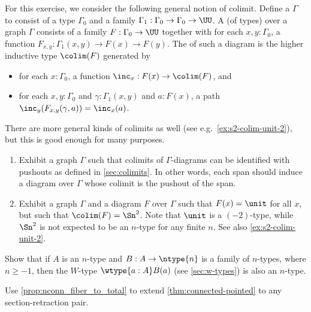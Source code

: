 \begin{ex}\label{ex:s2-colim-unit}
  For this exercise, we consider the following general notion of colimit.
  Define a  $\Gamma$ to consist of a type $\Gamma_0$ and a family $\Gamma_1 : \Gamma_0 \to \Gamma_0 \to \UU$.
  A  (of types) over a graph $\Gamma$ consists of a family $F:\Gamma_0 \to \UU$ together with for each $x,y:\Gamma_0$, a function $F_{x,y}:\Gamma_1(x,y) \to F(x) \to F(y)$.
  The  of such a diagram is the higher inductive type $\colim(F)$ generated by
  \begin{itemize}
  \item for each $x:\Gamma_0$, a function $\inc_x:F(x) \to \colim(F)$, and
  \item for each $x,y:\Gamma_0$ and $\gamma:\Gamma_1(x,y)$ and $a:F(x)$, a path $\inc_y(F_{x,y}(\gamma,a)) = \inc_x(a)$.
  \end{itemize}
  There are more general kinds of colimits as well (see e.g.\ \cref{ex:s2-colim-unit-2}), but this is good enough for many purposes.
  \begin{enumerate}
  \item Exhibit a graph $\Gamma$ such that colimits of $\Gamma$-diagrams can be identified with pushouts as defined in \cref{sec:colimits}.
    In other words, each span should induce a diagram over $\Gamma$ whose colimit is the pushout of the span.
  \item Exhibit a graph $\Gamma$ and a diagram $F$ over $\Gamma$ such that $F(x)=\unit$ for all $x$, but such that $\colim(F)=\Sn^2$.
    Note that $\unit$ is a $(-2)$-type, while $\Sn^2$ is not expected to be an $n$-type for any finite $n$.
    See also \cref{ex:s2-colim-unit-2}.
  \end{enumerate}
\end{ex}

\begin{ex}\label{ex:ntypes-closed-under-wtypes}
  Show that if $A$ is an $n$-type and $B:A\to \ntype{n}$ is a family of $n$-types, where $n\ge -1$, then the $W$-type $\wtype{a:A} B(a)$ (see \cref{sec:w-types}) is also an $n$-type.
\end{ex}

\begin{ex}\label{ex:connected-pointed-all-section-retraction}
  Use \cref{prop:nconn_fiber_to_total} to extend \cref{thm:connected-pointed} to any section-retraction pair.
\end{ex}

